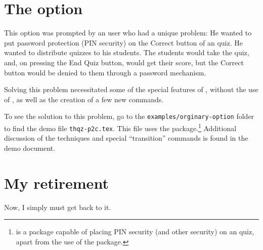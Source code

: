\documentclass{article}
\let\tops\texorpdfstring
\let\uif\textsf
\begin{document}
\section{The \tops{\protect{}}{ordinary} option}\label{ordinary}

This option was prompted by an  user who had a unique problem:
He wanted to put password protection (PIN security) on the \uif{Correct}
button of an  quiz. He wanted to distribute quizzes to his
students. The students would take the quiz, and, on pressing the \uif{End
Quiz} button, would get their score, but the \uif{Correct} button would be
denied to them through a password mechanism.

Solving this problem necessitated some of the special features of
, without the use of , as well as the creation
of a few new commands.

To see the solution to this problem, go to the
\texttt{examples/orginary-option} folder to find the demo file
\texttt{thqz-p2c.tex}. This file uses the
 package.\footnote{ is
a package capable of placing PIN security (and other security) on an  quiz, apart from the
use of the  package.}
Additional discussion of the techniques and special ``transition'' commands
is found in the demo document.


\section{My retirement}

Now, I simply must get back to it. \dps
\end{document}
